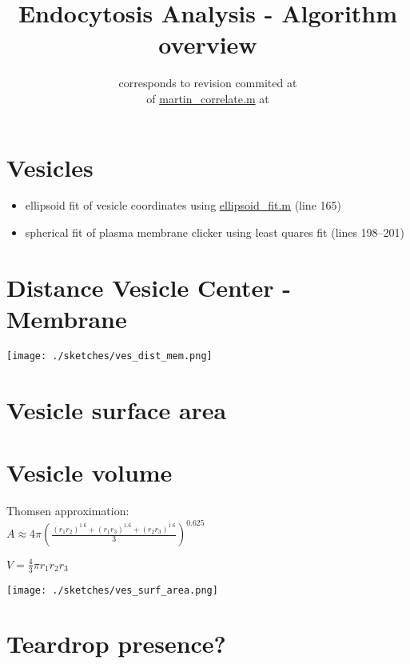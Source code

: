 \documentclass[10pt,a4paper,DIV17]{scrartcl}
\title{Endocytosis Analysis - Algorithm overview}
\author{\small{corresponds to revision \svnrev\; commited at \svndate}\\\small{ of \url{martin_correlate.m} at \svnkw{HeadURL}}
}
\begin{document}
 \maketitle

\section*{Vesicles}
\setcounter{section}{29} 
\begin{itemize}
 \item ellipsoid fit of vesicle coordinates using \url{ellipsoid_fit.m} (line 165)
 \item spherical fit of plasma membrane clicker using least quares fit (lines 198--201)
\end{itemize}
\section{Distance Vesicle Center - Membrane}
\begin{multicols}{2}


\columnbreak

\texttt{[image: ./sketches/ves\_dist\_mem.png]}
\end{multicols}

\section{Vesicle surface area}
\vspace*{-4mm}\section{Vesicle volume}
\begin{multicols}{2}


  Thomsen approximation:\\ $      A\approx 4\pi\!\left(\frac{ (r_1 r_2)^{1.6}+(r_1 r_3)^{1.6}+(r_2 r_3)^{1.6} }{3}\right)^{0.625} $

   $ V = \frac{4}{3} \pi r_1 r_2 r_3$ 

\columnbreak

\texttt{[image: ./sketches/ves\_surf\_area.png]}
\end{multicols}

\section{Teardrop presence?}\pagebreak
\end{document}
